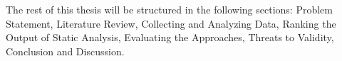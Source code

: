 

The rest of this thesis will be structured in the following sections: Problem Statement, Literature Review, Collecting and Analyzing Data, Ranking the Output of Static Analysis, Evaluating the Approaches, Threats to Validity, Conclusion and Discussion.




